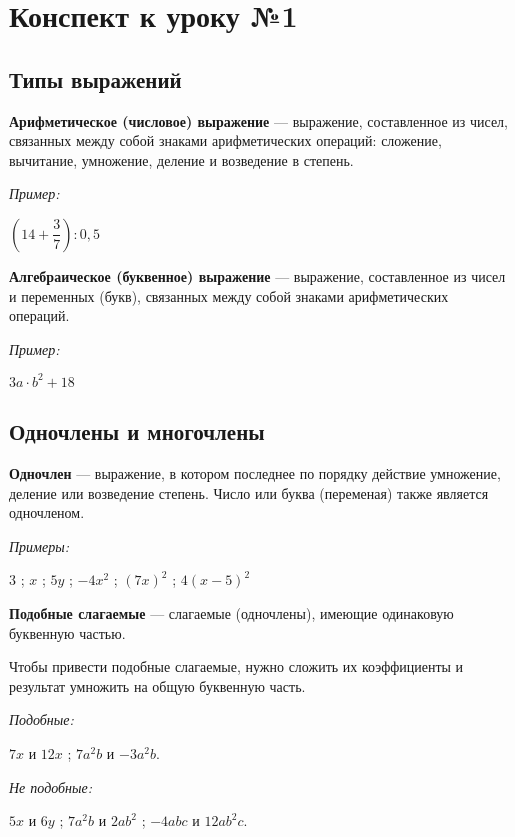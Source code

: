 \documentclass[12pt, a4paper]{article}
\begin{document}
		
	
	\section*{Конспект к уроку №1}
	\subsection*{Типы выражений}
	\textbf{Арифметическое (числовое) выражение} — выражение, составленное из чисел, связанных между собой знаками арифметических операций: сложение, вычитание, умножение, деление и возведение в степень.
	
	\textit{Пример:}
	\begin{center}
		$(14+\dfrac37):0,5$
	\end{center}

	\textbf{Алгебраическое (буквенное) выражение } — выражение, составленное из чисел и переменных (букв), связанных между собой знаками арифметических операций.
	
	\textit{Пример:}
	\begin{center}
		$3a\cdot b^2 + 18$
	\end{center}
	
	\subsection*{Одночлены и многочлены}
	
	\textbf{Одночлен} — выражение, в котором последнее по порядку действие умножение, деление или возведение степень. Число или буква (переменая) также является одночленом.
	
	\textit{Примеры:}
	\begin{center}
		$3$ ; $x$ ; $5y$ ; $-4x^2$ ; $(7x)^2$ ; $4(x-5)^2$
	\end{center}

	\textbf{Подобные слагаемые} — слагаемые (одночлены), имеющие одинаковую буквенную частью.

	Чтобы привести подобные слагаемые, нужно сложить их коэффициенты и результат умножить на общую буквенную часть.
	
	\textit{Подобные:}
	\begin{center}
		 $7x$ и $12x$ ; $7a^2b$ и $-3a^2b$.
	\end{center}
	
	\textit{Не подобные:}
	\begin{center}
		$5x$ и $6y$ ; $7a^2b$ и $2ab^2$ ; $-4abc$ и $12ab^2c$.
	\end{center}
\end{document}

